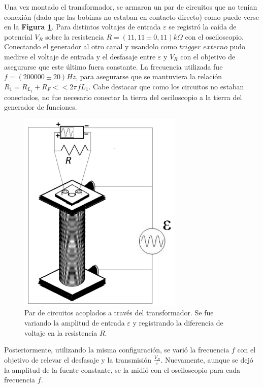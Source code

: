 \documentclass[11pt,a4paper]{article}
\begin{document}
Una vez montado el transformador, se armaron un par de circuitos que no tenian conexión (dado que las bobinas no estaban en contacto directo) como puede verse en la \textbf{Figura \ref{fig:trans1_circ}}. Para distintos voltajes de entrada $\varepsilon$ se registró la caída de potencial $V_R$ sobre la resistencia $R = (11,11 \pm 0,11)k\Omega$ con el osciloscopio. Conectando el generador al otro canal y usandolo como $trigger$ $externo$ pudo medirse el voltaje de entrada y el desfasaje entre $\varepsilon$ y $V_R$ con el objetivo de asegurarse que este último fuera constante. La frecuencia utilizada fue $f = (200000 \pm 20)Hz$, para asegurarse que se mantuviera la relación $R_1 = R_{L_1}+R_F << 2\pi fL_1$. Cabe destacar que como los circuitos no estaban conectados, no fue necesario conectar la tierra del osciloscopio a la tierra del generador de funciones. 


\begin{figure}[h!]
\centering
   \includegraphics[width=0.7\textwidth]{Transformadores1_circuito}
   \caption{Par de circuitos acoplados a través del transformador. Se fue variando la amplitud de entrada $\varepsilon$ y registrando la diferencia de voltaje en la resistencia $R$.}  
   \label{fig:trans1_circ}
\end{figure}

Posteriormente, utilizando la misma configuración, se varió la frecuencia $f$ con el objetivo de relevar el desfasaje y la transmisión $\frac{V_R}{\varepsilon}$. Nuevamente, aunque se dejó la amplitud de la fuente constante, se la midió con el osciloscopio para cada frecuencia $f$.
\end{document}
